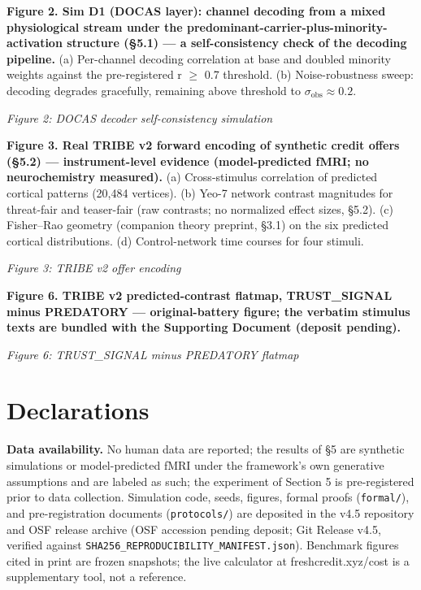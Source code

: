 \documentclass[11pt,twocolumn]{article}
\theoremstyle{plain}
\begin{document}
\textbf{Figure 2. Sim D1 (DOCAS layer): channel decoding from a mixed physiological stream under the predominant-carrier-plus-minority-activation structure (\S{}5.1) — a self-consistency check of the decoding pipeline.} (a) Per-channel decoding correlation at base and doubled minority weights against the pre-registered r $\geq$ 0.7 threshold. (b) Noise-robustness sweep: decoding degrades gracefully, remaining above threshold to $\sigma_{\mathrm{obs}} \approx 0.2$.

\textit{Figure 2: DOCAS decoder self-consistency simulation}

\textbf{Figure 3. Real TRIBE v2 forward encoding of synthetic credit offers (\S{}5.2) — instrument-level evidence (model-predicted fMRI; no neurochemistry measured).} (a) Cross-stimulus correlation of predicted cortical patterns (20,484 vertices). (b) Yeo-7 network contrast magnitudes for threat-fair and teaser-fair (raw contrasts; no normalized effect sizes, \S{}5.2). (c) Fisher–Rao geometry (companion theory preprint, \S{}3.1) on the six predicted cortical distributions. (d) Control-network time courses for four stimuli.

\textit{Figure 3: TRIBE v2 offer encoding}

\textbf{Figure 6. TRIBE v2 predicted-contrast flatmap, TRUST\_SIGNAL minus PREDATORY — original-battery figure; the verbatim stimulus texts are bundled with the Supporting Document (deposit pending).}

\textit{Figure 6: TRUST\_SIGNAL minus PREDATORY flatmap}




\FloatBarrier
\section*{Declarations}

\textbf{Data availability.} No human data are reported; the results of \S{}5 are synthetic simulations or model-predicted fMRI under the framework's own generative assumptions and are labeled as such; the experiment of Section 5 is pre-registered prior to data collection. Simulation code, seeds, figures, formal proofs (\texttt{formal/}), and pre-registration documents (\texttt{protocols/}) are deposited in the v4.5 repository and OSF release archive (OSF accession pending deposit; Git Release v4.5, verified against \texttt{SHA256\_REPRODUCIBILITY\_MANIFEST.json}). Benchmark figures cited in print are frozen snapshots; the live calculator at freshcredit.xyz/cost is a supplementary tool, not a reference.
\end{document}
